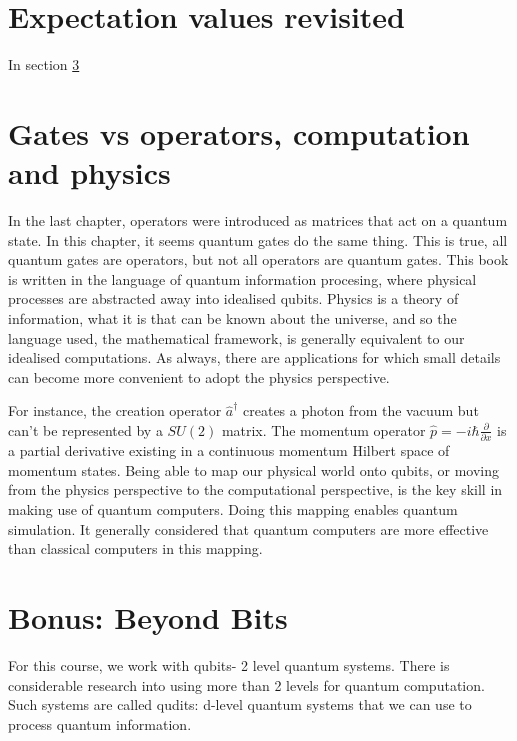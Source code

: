 \section{Expectation values revisited}

In section \ref{}

\section{Gates vs operators, computation and physics}

In the last chapter, operators were introduced as matrices that act on a quantum state. In this chapter, it seems quantum gates do the same thing. This is true, all quantum gates are operators, but not all operators are quantum gates. This book is written in the language of quantum information procesing, where physical processes are abstracted away into idealised qubits. Physics is a theory of information, what it is that can be known about the universe, and so the language used, the mathematical framework, is generally equivalent to our idealised computations. As always, there are applications for which small details can become more convenient to adopt the physics perspective. 

For instance, the creation operator $\hat{a}^\dagger$ creates a photon from the vacuum but can't be represented by a $SU(2)$ matrix. The momentum operator $\hat{p} = -i\hbar\frac{\partial}{\partial x}$ is a partial derivative existing in a continuous momentum Hilbert space of momentum states. Being able to map our physical world onto qubits, or moving from the physics perspective to the computational perspective, is the key skill in making use of quantum computers. Doing this mapping enables quantum simulation. It generally considered that quantum computers are more effective than classical computers in this mapping.  

\section{ Bonus: Beyond Bits }

For this course, we work with qubits- 2 level quantum systems. There is considerable research into using more than 2 levels for quantum computation. Such systems are called qudits: d-level quantum systems that we can use to process quantum information. 

